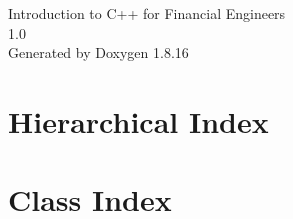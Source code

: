 \let\mypdfximage\pdfximage\def\pdfximage{\immediate\mypdfximage}\documentclass[twoside]{book}
\newcommand{\+}{\discretionary{\mbox{\scriptsize$\hookleftarrow$}}{}{}}
\newcommand{\clearemptydoublepage}{%
  \newpage{\pagestyle{empty}\cleardoublepage}%
}
\begin{document}
\hypersetup{pageanchor=false,
             bookmarksnumbered=true,
             pdfencoding=unicode
            }
\begin{titlepage}
\vspace*{7cm}
\begin{center}%
{\Large Introduction to C++ for Financial Engineers \\[1ex]\large 1.\+0 }\\
\vspace*{1cm}
{\large Generated by Doxygen 1.8.16}\\
\end{center}
\end{titlepage}
\clearemptydoublepage
{}
\tableofcontents
\clearemptydoublepage
{}
\hypersetup{pageanchor=true}

\chapter{Hierarchical Index}

\chapter{Class Index}

\end{document}
